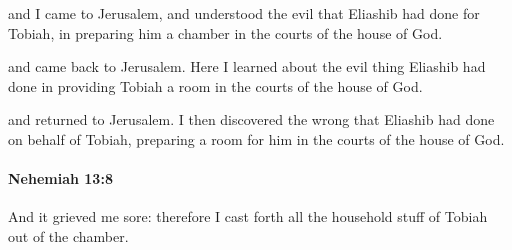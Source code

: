 			\begin{versebox}
					\item[BHS] 
					\item[LXX] 
					\item[ASV] and I came to Jerusalem, and understood the evil that Eliashib had done for Tobiah, in preparing him a chamber in the courts of the house of God.
					\item[NIV] and came back to Jerusalem. Here I learned about the evil thing Eliashib had done in providing Tobiah a room in the courts of the house of God.
					\item[NRSV] and returned to Jerusalem. I then discovered the wrong that Eliashib had done on behalf of Tobiah, preparing a room for him in the courts of the house of God.
			\end{versebox}

		\paragraph{Nehemiah 13:8} %
			\label{NEHEMIAH-13-8}

			And it grieved me sore: therefore I cast forth all the household stuff of Tobiah out of the chamber.

